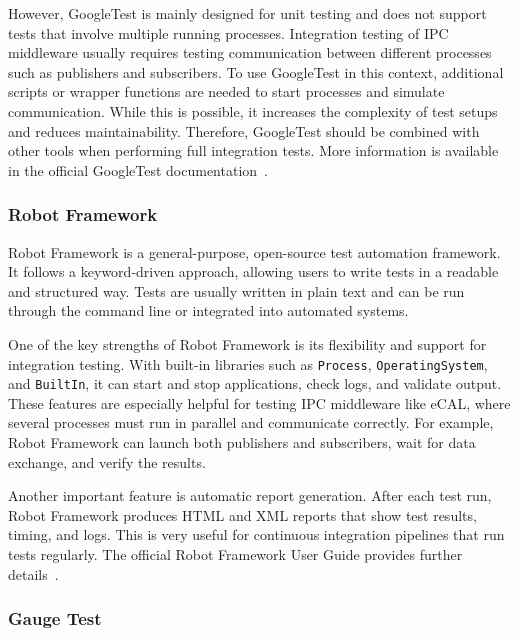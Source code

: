 \vspace{1em}
However, GoogleTest is mainly designed for unit testing and does not support tests that involve multiple running processes. Integration testing of IPC middleware usually requires testing communication between different processes such as publishers and subscribers. To use GoogleTest in this context, additional scripts or wrapper functions are needed to start processes and simulate communication. While this is possible, it increases the complexity of test setups and reduces maintainability. Therefore, GoogleTest should be combined with other tools when performing full integration tests. More information is available in the official GoogleTest documentation~\cite{GoogleTestDocs}.

\subsubsection*{Robot Framework}

Robot Framework is a general-purpose, open-source test automation framework. It follows a keyword-driven approach, allowing users to write tests in a readable and structured way. Tests are usually written in plain text and can be run through the command line or integrated into automated systems.

\vspace{1em}
One of the key strengths of Robot Framework is its flexibility and support for integration testing. With built-in libraries such as \texttt{Process}, \texttt{OperatingSystem}, and \texttt{BuiltIn}, it can start and stop applications, check logs, and validate output. These features are especially helpful for testing IPC middleware like eCAL, where several processes must run in parallel and communicate correctly. For example, Robot Framework can launch both publishers and subscribers, wait for data exchange, and verify the results.

\vspace{1em}
Another important feature is automatic report generation. After each test run, Robot Framework produces HTML and XML reports that show test results, timing, and logs. This is very useful for continuous integration pipelines that run tests regularly. The official Robot Framework User Guide provides further details~\cite{RobotFrameworkDocs}.

\subsubsection*{Gauge Test}

